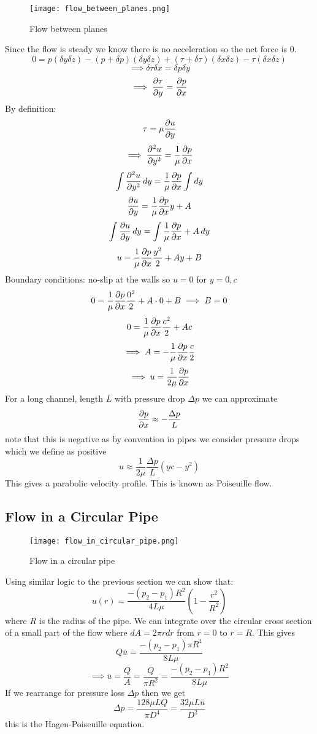 \documentclass{article}
\begin{document}
    \begin{figure}[ht]
        \centering
        \texttt{[image: flow\_between\_planes.png]}
        \caption{Flow between planes}
    \end{figure}
    Since the flow is steady we know there is no acceleration so the net force is 0.
    \[0 = p(\delta y\delta z) - (p + \delta p)(\delta y\delta z) + (\tau + \delta \tau)(\delta x\delta z) - \tau(\delta x\delta z)\]
    \[\implies \delta \tau\delta x = \delta p\delta y\]
    \[\implies\pdv{\tau}{y} = \pdv{p}{x}\]
    By definition:
    \[\tau = \mu\pdv{u}{y}\]
    \[\implies\pdv[2]{u}{y} = \frac{1}{\mu}\pdv{p}{x}\]
    \[\int \pdv[2]{u}{y}\,dy = \frac{1}{\mu}\pdv{p}{x}\int dy\]
    \[\pdv{u}{y} = \frac{1}{\mu}\pdv{p}{x}y + A\]
    \[\int \pdv{u}{y}\,dy = \int \frac{1}{\mu}\pdv{p}{x} + A\,dy\]
    \[u = \frac{1}{\mu}\pdv{p}{x}\frac{y^2}{2} + Ay + B\]
    Boundary conditions: no-slip at the walls so \(u = 0\) for \(y = 0, c\)
    \[0 = \frac{1}{\mu}\pdv{p}{x}\frac{0^2}{2} + A\cdot0 + B\implies B = 0\]
    \[0 = \frac{1}{\mu}\pdv{p}{x}\frac{c^2}{2} + Ac\]
    \[\implies A = -\frac{1}{\mu}\pdv{p}{x}\frac{c}{2}\]
    \[\implies u = \frac{1}{2\mu}\pdv{p}{x}(y^2 - yc)\]
    For a long channel, length \(L\) with pressure drop \(\Delta p\) we can approximate
    \[\pdv{p}{x}\approx -\frac{\Delta p}{L}\]
    note that this is negative as by convention in pipes we consider pressure drops which we define as positive
    \[u \approx \frac{1}{2\mu}\frac{\Delta p}{L}(yc - y^2)\]
    This gives a parabolic velocity profile.
    This is known as Poiseuille flow.
    \subsection{Flow in a Circular Pipe}

    \begin{figure}
        \centering
        \texttt{[image: flow\_in\_circular\_pipe.png]}
        \caption{Flow in a circular pipe}
    \end{figure}
    Using similar logic to the previous section we can show that:
    \[u(r) = \frac{-(p_2 - p_1)R^2}{4L\mu}\left(1 - \frac{r^2}{R^2}\right)\]
    where \(R\) is the radius of the pipe.
    We can integrate over the circular cross section of a small part of the flow where \(dA = 2\pi rdr\) from \(r = 0\) to \(r = R\). 
    This gives
    \[Q\bar u = \frac{-(p_2 - p_1)\pi R^4}{8L\mu}\]
    \[\implies \bar u = \frac{Q}{A} = \frac{Q}{\pi R^2} = \frac{-(p_2 - p_1)R^2}{8L\mu}\]
    If we rearrange for pressure loss \(\Delta p\) then we get
    \begin{equation}\label{eqn:hagen-poiseuille}
        \Delta p = \frac{128\mu L Q}{\pi D^4} = \frac{32\mu L\bar u}{D^2}
    \end{equation}
    this is the Hagen-Poiseuille equation.
\end{document}
